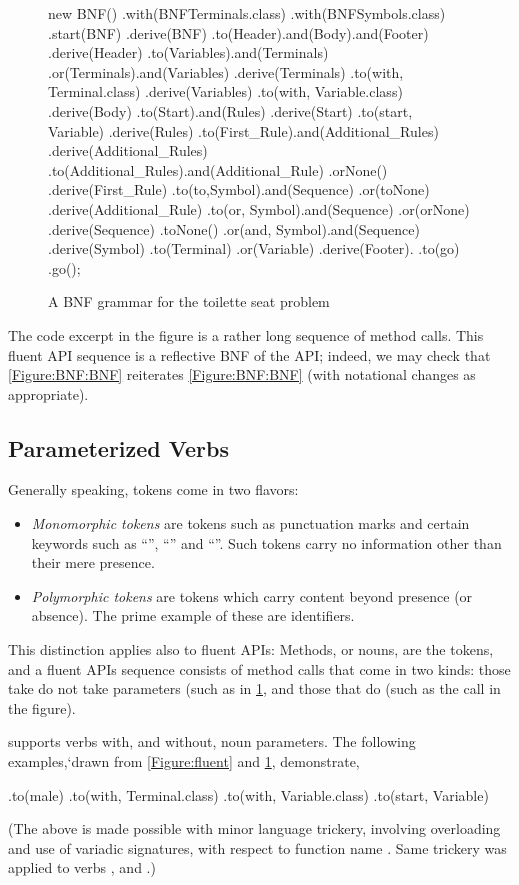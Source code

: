 \begin{figure}[H]
  \begin{JAVA}[style=numbered]
new BNF()
  .with(BNFTerminals.class)
  .with(BNFSymbols.class)
  .start(BNF)
  .derive(BNF)
    .to(Header).and(Body).and(Footer)
  .derive(Header)
    .to(Variables).and(Terminals)
    .or(Terminals).and(Variables)
  .derive(Terminals)
    .to(with, Terminal.class)
  .derive(Variables)
    .to(with, Variable.class)
  .derive(Body)
    .to(Start).and(Rules)
  .derive(Start)
    .to(start, Variable)
  .derive(Rules)
    .to(First_Rule).and(Additional_Rules)
  .derive(Additional_Rules)
    .to(Additional_Rules).and(Additional_Rule)
    .orNone()
  .derive(First_Rule)
    .to(to,Symbol).and(Sequence)
    .or(toNone)
  .derive(Additional_Rule)
    .to(or, Symbol).and(Sequence)
    .or(orNone)
  .derive(Sequence)
    .toNone()
    .or(and, Symbol).and(Sequence)
  .derive(Symbol)
    .to(Terminal)
    .or(Variable)
  .derive(Footer).
     .to(go)
.go();\end{JAVA}
  \caption{A BNF grammar for the toilette seat problem}
  \label{Figure:BNF:fluent}
\end{figure}

The code excerpt in the figure is a rather long
  sequence of method calls.
This fluent API sequence is a reflective BNF 
  of the \SELF API;
  indeed, we may check that \cref{Figure:BNF:BNF} reiterates \cref{Figure:BNF:BNF}
  (with notational changes as appropriate). 

\subsection{Parameterized Verbs}
Generally speaking, tokens come in two flavors:
\begin{itemize}
  \item \emph{Monomorphic tokens} are tokens such as punctuation marks and
    certain keywords such as ``'', ``'' and ``''.
    Such tokens carry no information other than their mere presence.
  \item \emph{Polymorphic tokens} are tokens which carry content beyond
    presence (or absence).  The prime example of these are identifiers.
\end{itemize}

This distinction applies also to fluent APIs:
Methods, or nouns, are the tokens, and a fluent APIs sequence consists of 
method calls that come in two kinds: those take do not take parameters (such as  in \cref{Figure:BNF:fluent}, 
and those that do (such as the call  in the figure).

\SELF supports verbs with, and without, noun parameters. 
The following examples,`drawn from \cref{Figure:fluent} and \cref{Figure:BNF:fluent},
  demonstrate, 
\begin{JAVA}
    .to(male)
    .to(with, Terminal.class)
    .to(with, Variable.class)
    .to(start, Variable)\end{JAVA}
(The above is made possible with minor \Java language trickery,
  involving overloading and use of variadic signatures,
  with respect to function name .
Same trickery was applied to verbs , and .)



  
